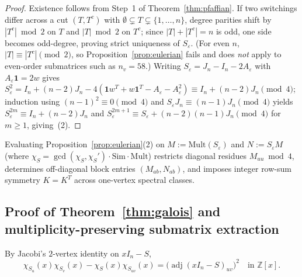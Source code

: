 \documentclass[11pt,reqno]{amsart}
\theoremstyle{definition}
\theoremstyle{remark}
\DeclareMathOperator{\adj}{adj}
\begin{document}
\begin{proof}
Existence follows from Step~1 of Theorem~\ref{thm:pfaffian}. If two switchings differ across a cut $(T, T^c)$ with $\emptyset \subsetneq T \subsetneq \{1,\dots,n\}$, degree parities shift by $|T^c| \bmod 2$ on $T$ and $|T| \bmod 2$ on $T^c$; since $|T| + |T^c| = n$ is odd, one side becomes odd-degree, proving strict uniqueness of $S_\varepsilon$. (For even $n$, $|T| \equiv |T^c| \pmod 2$, so Proposition~\ref{prop:eulerian} fails and does \emph{not} apply to even-order submatrices such as $n_v = 58$.) Writing $S_\varepsilon = J_n - I_n - 2A_\varepsilon$ with $A_\varepsilon\mathbf{1} = 2w$ gives $S_\varepsilon^2 = I_n + (n-2)J_n - 4(\mathbf{1}w^T + w\mathbf{1}^T - A_\varepsilon - A_\varepsilon^2) \equiv I_n + (n-2)J_n \pmod 4$; induction using $(n-1)^2 \equiv 0 \pmod 4$ and $S_\varepsilon J_n \equiv (n-1)J_n \pmod 4$ yields $S_\varepsilon^{2m} \equiv I_n + (n-2)J_n$ and $S_\varepsilon^{2m+1} \equiv S_\varepsilon + (n-2)(n-1)J_n \pmod 4$ for $m \ge 1$, giving~(2).
\end{proof}

Evaluating Proposition~\ref{prop:eulerian}(2) on $M := \mathrm{Mult}(S_\varepsilon)$ and $N := S_\varepsilon M$ (where $\chi_S = \gcd(\chi_S, \chi_S') \cdot \mathrm{Sim} \cdot \mathrm{Mult}$) restricts diagonal residues $M_{uu} \bmod 4$, determines off-diagonal block entries $(M_{ab}, N_{ab})$, and imposes integer row-sum symmetry $K = K^T$ across one-vertex spectral classes.

\subsection{Proof of Theorem~\ref{thm:galois} and multiplicity-preserving submatrix extraction}
By Jacobi's $2$-vertex identity on $xI_n - S$,
\begin{equation}\label{eq:jacobi2}
  \chi_{S_u}(x)\chi_{S_v}(x) - \chi_S(x)\chi_{S_{uv}}(x) = \big(\adj(xI_n - S)_{uv}\big)^2 \quad \text{in } \mathbb{Z}[x].
\end{equation}
\end{document}
